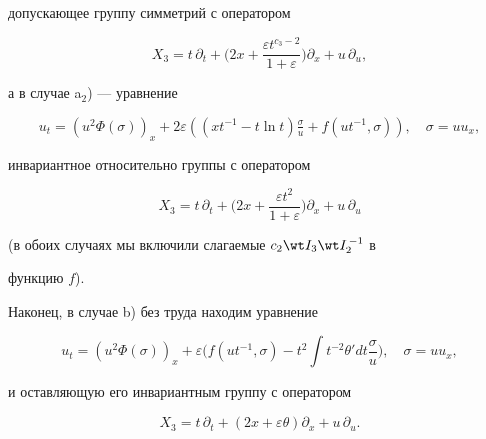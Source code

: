 допускающее группу симметрий с оператором 


\begin{equation} 


X_3=t\,\partial _t+ 


\bigg(2x+\frac{\varepsilon t^{c_3-2}}{1+\varepsilon} \bigg) 


\partial _x+u\,\partial _u, \tag{10.7} 


\end{equation} 


а в случае a$_2$) --- уравнение 


\begin{equation} 


u_t=(u^2\Phi(\sigma))_x+2\varepsilon((x t^{-1}- 


t\ln t)\tfrac{\sigma}{u}+f(u t^{-1},\sigma)),\quad 


\sigma=u u_x,\tag{10.8} 


\end{equation} 


инвариантное относительно группы с оператором 


\begin{equation} 


X_3=t\,\partial _t+\bigg(2x+ 


\frac{\varepsilon t^2}{1+\varepsilon} \bigg)\partial _x+ 


u\,\partial _u \tag{10.9} 


\end{equation} 


(в обоих случаях мы включили слагаемые $c_2\wt I_3\wt I^{\,-1}_2$ в 


функцию $f$). 


 


Наконец, в случае b) без труда находим уравнение 


\begin{equation} 


u_t=(u^2\Phi(\sigma))_x+\varepsilon\Big(f(u t^{-1},\sigma)- 


t^2\int t^{-2}\theta'dt\frac{\sigma}{u}\Big),\quad 


\sigma=u u_x,\tag{10.10} 


\end{equation} 


и оставляющую его инвариантным группу с оператором 


\begin{equation} 


X_3=t\,\partial _t+(2x+\varepsilon\theta)\partial _x+ 


u\,\partial _u. \tag{10.11} 


\end{equation} 


